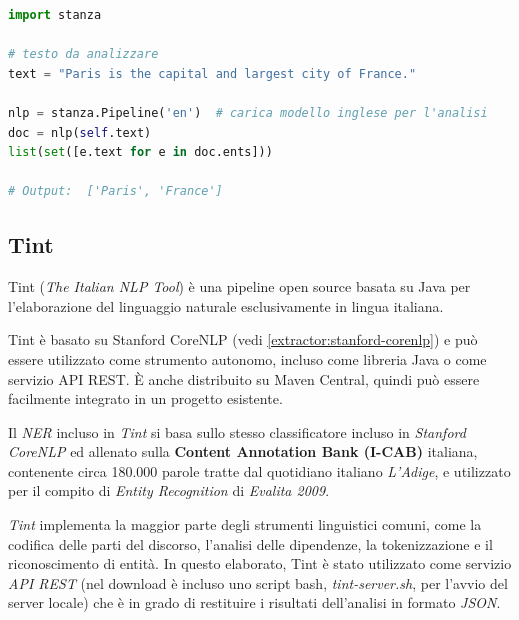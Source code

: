 \documentclass[a4paper,11pt]{article}
\begin{document}
\begin{lstlisting}[basicstyle=\small, language=python, frame=single, caption={Esempio di codice Python per l'estrazione di entità con \textit{Stanza}.},captionpos=b]
import stanza

# testo da analizzare
text = "Paris is the capital and largest city of France."

nlp = stanza.Pipeline('en')  # carica modello inglese per l'analisi
doc = nlp(self.text)
list(set([e.text for e in doc.ents]))

# Output:  ['Paris', 'France']
\end{lstlisting}

\subsection{Tint}
\label{extractor:tint}
Tint (\textit{The Italian NLP Tool}) è una pipeline open source basata su Java per l'elaborazione del linguaggio naturale esclusivamente in lingua italiana. \cite{tint}

Tint è basato su Stanford CoreNLP (vedi \ref{extractor:stanford-corenlp}) e può essere utilizzato come strumento autonomo, incluso come libreria Java o come servizio API REST. È anche distribuito su Maven Central, quindi può essere facilmente integrato in un progetto esistente.

Il \textit{NER} incluso in \textit{Tint} si basa sullo stesso classificatore incluso in \textit{Stanford CoreNLP} ed allenato sulla \textbf{Content Annotation Bank (I-CAB)} italiana, contenente circa 180.000 parole tratte dal quotidiano italiano \textit{L'Adige}, e utilizzato per il compito di \textit{Entity Recognition} di \textit{Evalita 2009}. \cite{dataset-it}

\textit{Tint} implementa la maggior parte degli strumenti linguistici comuni, come la codifica delle parti del discorso, l'analisi delle dipendenze, la tokenizzazione e il riconoscimento di entità. In questo elaborato, Tint è stato utilizzato come servizio \textit{API REST} (nel download è incluso uno script bash, \textit{tint-server.sh}, per l'avvio del server locale) che è in grado di restituire i risultati dell'analisi in formato \textit{JSON}.
\newline
\end{document}
